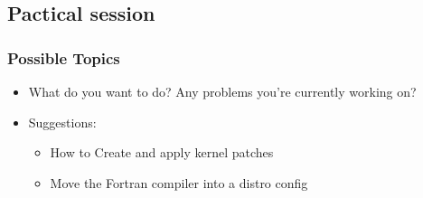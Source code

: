 \subsection{Pactical session}

\begin{frame}
\frametitle{Possible Topics}
  \begin{itemize}
     \item What do you want to do? Any problems you're currently working on?
     \item Suggestions:
        \begin{itemize}
           \item How to Create and apply kernel patches
           \item Move the Fortran compiler into a distro config
        \end{itemize}
 \end{itemize}
\end{frame}

